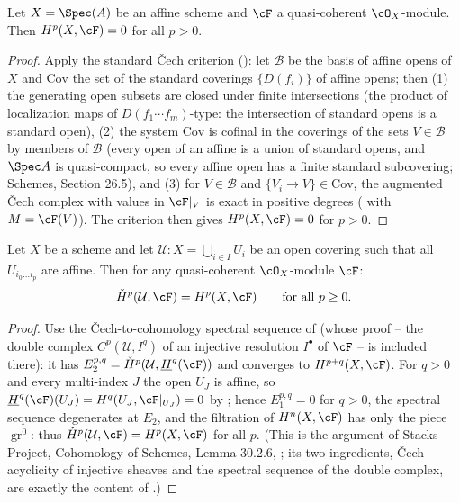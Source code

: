 \begin{lemma}
\label{lem:pc-affine-vanishing}
Let $X=\Spec(A)$ be an affine scheme and $\cF$ a quasi-coherent
$\cO_X$-module.  Then $H^p(X,\cF)=0$ for all $p>0$.
\end{lemma}
\begin{proof}
Apply the standard Čech criterion
(): let
$\mathcal B$ be the basis of affine opens of $X$ and $\mathrm{Cov}$ the
set of the standard coverings $\{D(f_i)\}$ of affine opens; then
(1) the generating open subsets are closed under finite intersections
(the product of localization maps of $D(f_1\cdots f_m)$-type: the
intersection of standard opens is a standard open), (2) the system
$\mathrm{Cov}$ is cofinal in the coverings of the sets $V\in\mathcal B$
by members of $\mathcal B$ (every open of an affine is a union of
standard opens, and $\Spec A$ is quasi-compact, so every affine open
has a finite standard subcovering; Schemes, Section 26.5), and
(3) for $V\in\mathcal B$ and $\{V_i\to V\}\in\mathrm{Cov}$, the
augmented Čech complex with values in $\cF|_V$ is exact in positive
degrees ( with $M=\cF(V)$).  The
criterion then gives $H^p(X,\cF)=0$ for $p>0$.
\end{proof}

\begin{lemma}
\label{lem:pc-cech-computes}
Let $X$ be a scheme and let $\mathcal U:X=\bigcup_{i\in I}U_i$ be an
open covering such that all $U_{i_0\dots i_p}$ are affine.  Then for any
quasi-coherent $\cO_X$-module $\cF$:
\[
\check H^p(\mathcal U,\cF)=H^p(X,\cF)\qquad\text{for all }p\ge0 .
\]
\end{lemma}
\begin{proof}
Use the Čech-to-cohomology spectral sequence of
 (whose proof -- the double complex
$C^p(\mathcal U,I^q)$ of an injective resolution $I^\bullet$ of
$\cF$ -- is included there): it has
$E_2^{p,q}=\check H^p(\mathcal U,\underline H^q(\cF))$ and converges to
$H^{p+q}(X,\cF)$.  For $q>0$ and every multi-index $J$ the open $U_J$
is affine, so
$\underline H^q(\cF)(U_J)=H^q(U_J,\cF|_{U_J})=0$ by
; hence $E_1^{p,q}=0$ for $q>0$, the
spectral sequence degenerates at $E_2$, and the filtration of
$H^n(X,\cF)$ has only the piece $\operatorname{gr}^0$: thus
$\check H^p(\mathcal U,\cF)=H^p(X,\cF)$ for all $p$.  (This is the
argument of Stacks Project, Cohomology of Schemes, Lemma 30.2.6,
; its two
ingredients, Čech acyclicity of injective sheaves and the spectral
sequence of the double complex, are exactly the content of
.)
\end{proof}

